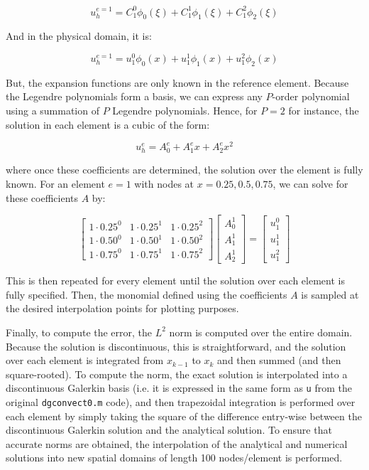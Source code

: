 \documentclass[10pt]{article}
\newcommand{\beq}{\begin{equation}}
\newcommand{\eeq}{\end{equation}}
\begin{document}
\beq
u_h^{e=1}=C_1^0\phi_0(\xi)+C_1^1\phi_1(\xi)+C_1^2\phi_2(\xi)
\eeq

And in the physical domain, it is:

\beq
u_h^{e=1}=u_1^0\phi_0(x)+u_1^1\phi_1(x)+u_1^2\phi_2(x)
\eeq

But, the expansion functions are only known in the reference element. Because the Legendre polynomials form a basis, we can express any \(P\)-order polynomial using a summation of \(P\) Legendre polynomials. Hence, for \(P=2\) for instance, the solution in each element is a cubic of the form:

\beq
u_h^e=A_0^e+A_1^ex+A_2^ex^2
\eeq

where once these coefficients are determined, the solution over the element is fully known. For an element \(e=1\) with nodes at \(x=0.25, 0.5, 0.75\), we can solve for these coefficients \(A\) by:

\beq
\begin{bmatrix}
1\cdot 0.25^0 & 1\cdot 0.25^1 & 1\cdot 0.25^2\\
1\cdot 0.50^0 & 1\cdot 0.50^1 & 1\cdot 0.50^2\\
1\cdot 0.75^0 & 1\cdot 0.75^1 & 1\cdot 0.75^2
\end{bmatrix}
\begin{bmatrix}
A_0^1\\
A_1^1\\
A_2^1
\end{bmatrix}
=
\begin{bmatrix}
u_1^0\\
u_1^1\\
u_1^2
\end{bmatrix}
\eeq

This is then repeated for every element until the solution over each element is fully specified. Then, the monomial defined using the coefficients \(A\) is sampled at the desired interpolation points for plotting purposes. 

Finally, to compute the error, the \(L^2\) norm is computed over the entire domain. Because the solution is discontinuous, this is straightforward, and the solution over each element is integrated from \(x_{k-1}\) to \(x_k\) and then summed (and then square-rooted). To compute the norm, the exact solution is interpolated into a discontinuous Galerkin basis (i.e. it is expressed in the same form as {\tt u} from the original {\tt dgconvect0.m} code), and then trapezoidal integration is performed over each element by simply taking the square of the difference entry-wise between the discontinuous Galerkin solution and the analytical solution. To ensure that accurate norms are obtained, the interpolation of the analytical and numerical solutions into new spatial domains of length 100 nodes/element is performed. 
\end{document}
